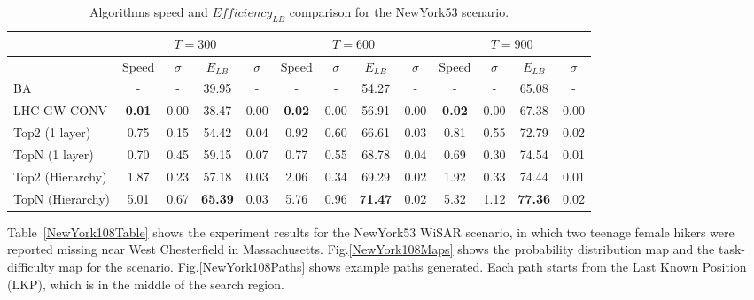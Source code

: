 \begin{center}
\begin{table*}[hbtp]
{
\scriptsize
\hfill{}
\setlength{\extrarowheight}{1.5pt}
\begin{tabular}
{|l|c|c|c|c|c|c|c|c|c|c|c|c|}
\hline
& \multicolumn{4}{|c|}{$T=300$} & \multicolumn{4}{|c|}{$T=600$} & \multicolumn{4}{|c|}{$T=900$} \\ 
\hline
& Speed & $\sigma$ & $\mathit{E_{LB}}$ & $\sigma$ & Speed & $\sigma$ & $\mathit{E_{LB}}$ & $\sigma$ & Speed & $\sigma$ & $\mathit{E_{LB}}$ & $\sigma$\\ 
\hline
BA & - & - & 39.95 & - & - & - & 54.27 & - & - & - & 65.08 & - \\ 
\hline
LHC-GW-CONV & \textbf{0.01} & 0.00 & 38.47 & 0.00 & \textbf{0.02} & 0.00 & 56.91 & 0.00 & \textbf{0.02} & 0.00 & 67.38 & 0.00\\ 
\hline
Top2 (1 layer) & 0.75 & 0.15 & 54.42 & 0.04 & 0.92 & 0.60 & 66.61 & 0.03 & 0.81 & 0.55 & 72.79 & 0.02\\ 
\hline
TopN (1 layer) & 0.70 & 0.45 & 59.15 & 0.07 & 0.77 & 0.55 & 68.78 & 0.04 & 0.69 & 0.30 & 74.54 & 0.01\\ 
\hline
Top2 (Hierarchy) & 1.87 & 0.23 & 57.18 & 0.03 & 2.06 & 0.34 & 69.29 & 0.02 & 1.92 & 0.33 & 74.44 & 0.01\\ 
\hline
TopN (Hierarchy) & 5.01 & 0.67 & \textbf{65.39} & 0.03 & 5.76 & 0.96 & \textbf{71.47} & 0.02 & 5.32 & 1.12 & \textbf{77.36} & 0.02\\ 
\hline
\end{tabular}}
\medskip
\caption{Algorithms speed and $\mathit{Efficiency_{LB}}$ comparison for the NewYork53 scenario.}
\label{NewYork53Table}
\vspace*{-5ex}
\end{table*}
\end{center}


Table~\ref{NewYork108Table} shows the experiment results for the NewYork53 WiSAR scenario, in which two teenage female hikers were reported missing near West Chesterfield in Massachusetts. Fig.\ref{NewYork108Maps} shows the probability distribution map and the task-difficulty map for the scenario. Fig.\ref{NewYork108Paths} shows example paths generated. Each path starts from the Last Known Position (LKP), which is in the middle of the search region.

